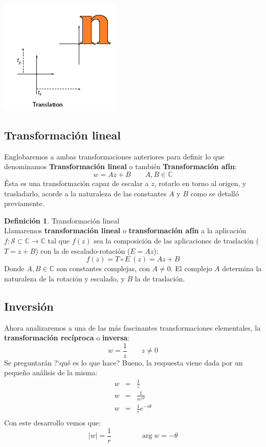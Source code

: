\documentclass[12pt]{article}
\theoremstyle{definition}
\newtheorem{definition}{Definici\'on}[section]
\theoremstyle{theorem}
\theoremstyle{corolary}
\begin{document}
\begin{center}
	\includegraphics[scale=1]{translation.png}
\end{center}


\subsection{Transformaci\'on lineal}
Englobaremos a ambas transformaciones anteriores para definir lo que denominamos \textbf{Transformaci\'on lineal} o tambi\'en \textbf{Transformaci\'on af\'in}: $$w = Az + B \qquad A,B \in \mathbb{C}$$
\'Esta es una transformaci\'on capaz de escalar a $z$, rotarlo en torno al origen, y trasladarlo, acorde a la naturaleza de las constantes $A$ y $B$ como se detall\'o previamente.\\

\colorbox{green!40!white!80}{\parbox{\linewidth}{
 \theoremstyle{definition}
 \begin{definition}{Transformaci\'on lineal}\\
  	Llamaremos \textbf{transformaci\'on lineal} o \textbf{transformaci\'on af\'in} a la aplicaci\'on $f: \mathcal{S} \subset \mathbb{C} \rightarrow \mathbb{C}$ tal que $f(z)$ sea la composici\'on de las aplicaciones de traslaci\'on ($T = z + B$) con la de escalado-rotaci\'on ($E=Az$): $$f(z) = T \circ E\ (z) = Az + B$$
  	 Donde $A,B \in \mathbb{C}$ son constantes complejas, con  $A\neq 0$. El complejo $A$ determina la naturaleza de la rotaci\'on y escalado, y $B$ la de traslaci\'on.
 \end{definition}}}
\linebreak
\linebreak

\subsection{Inversi\'on}
Ahora analizaremos a una de las m\'as fascinantes transformaciones elementales, la \textbf{transformaci\'on rec\'iproca} o \textbf{inversa}: $$w = \frac{1}{z} \qquad z \neq 0$$
Se preguntar\'an ?`qu\'e es lo que hace? Bueno, la respuesta viene dada por un peque\~no an\'alisis de la misma:
\begin{eqnarray*}
w &=& \frac{1}{z}\\
w &=& \frac{1}{re^{i\theta}}\\
w &=& \frac{1}{r}e^{-i\theta}\\
\end{eqnarray*}
Con este desarrollo vemos que: $$|w| = \frac{1}{r} \qquad \qquad \arg w = -\theta$$
\end{document}
